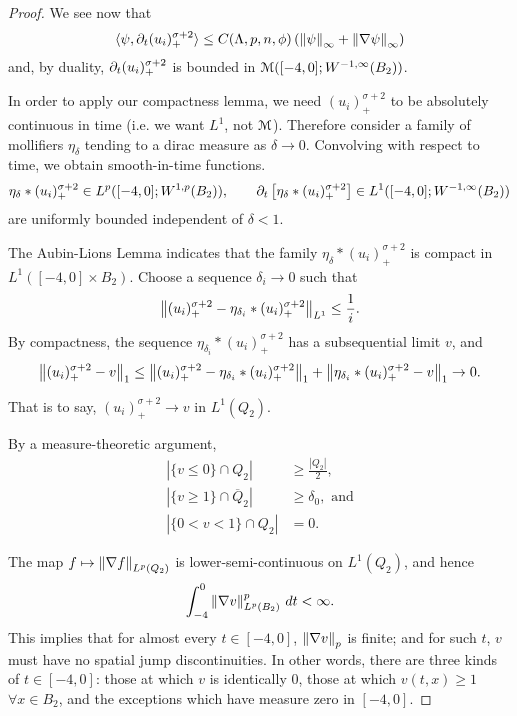 \begin{proof}
We see now that
\[ \langle \psi,\partial_t (u_i)_+^{\sigma+2} \rangle \leq C(\Lambda,p,n,\phi) \left( \left\lVert\psi\right\rVert_\infty + \left\lVert\nabla \psi\right\rVert_\infty \right)\]
and, by duality, $\partial_t (u_i)_+^{\sigma+2}$ is bounded in $\mathcal{M}([-4,0];W^{-1,\infty}(B_2))$.  

In order to apply our compactness lemma, we need $(u_i)_+^{\sigma+2}$ to be absolutely continuous in time (i.e. we want $L^1$, not $\mathcal{M}$).  Therefore consider a family of mollifiers $\eta_\delta$ tending to a dirac measure as $\delta \to 0$.  Convolving with respect to time, we obtain smooth-in-time functions.  
\[ \eta_\delta \ast (u_i)_+^{\sigma+2} \in L^p([-4,0]; W^{1,p}(B_2)), \qquad \partial_t \left[\eta_\delta \ast (u_i)_+^{\sigma+2} \right] \in L^1([-4,0];W^{-1,\infty}(B_2)) \]
are uniformly bounded independent of $\delta < 1$.  

The Aubin-Lions Lemma indicates that the family $\eta_\delta \ast (u_i)_+^{\sigma+2}$ is compact in $L^1([-4,0]\times B_2)$.  Choose a sequence $\delta_i \to 0$ such that
\[ \left\lVert(u_i)_+^{\sigma+2} - \eta_{\delta_i} \ast (u_i)_+^{\sigma+2}\right\rVert_{L^1} \leq \frac{1}{i}.\]
By compactness, the sequence $\eta_{\delta_i} \ast (u_i)_+^{\sigma+2}$ has a subsequential limit $v$, and
\[ \left\lVert(u_i)_+^{\sigma+2} - v\right\rVert_1 \leq \left\lVert(u_i)_+^{\sigma+2} - \eta_{\delta_i} \ast (u_i)_+^{\sigma+2}\right\rVert_1 + \left\lVert\eta_{\delta_i} \ast (u_i)_+^{\sigma+2} - v\right\rVert_1 \to 0.\]  

That is to say, $(u_i)_+^{\sigma+2} \to v$ in $L^1(Q_2)$.  


By a measure-theoretic argument, 
\begin{align*}
\tag{*} |\{v \leq 0\} \cap Q_2| &\geq \frac{|Q_2|}{2}, \label{measure_of_v_half} \\
\tag{**} |\{v \geq 1\} \cap \overline{Q}_2| &\geq \delta_0, \textrm{ and} \label{measure_of_v_delta} \\
|\{ 0 < v < 1 \} \cap Q_2| &= 0. 
\end{align*}

The map $f \mapsto \left\lVert\nabla f\right\rVert_{L^p(Q_2)}$ is lower-semi-continuous on $L^1(Q_2)$, and hence 
\[ \int_{-4}^0 \left\lVert\nabla v\right\rVert_{L^p(B_2)}^p \,dt < \infty.\]
This implies that for almost every $t \in [-4,0]$, $\left\lVert\nabla v\right\rVert_p$ is finite; and for such $t$, $v$ must have no spatial jump discontinuities.  In other words, there are three kinds of $t \in [-4,0]$: those at which $v$ is identically 0, those at which $v(t,x) \geq 1$ $\forall x \in B_2$, and the exceptions which have measure zero in $[-4,0]$.  


\end{proof}
